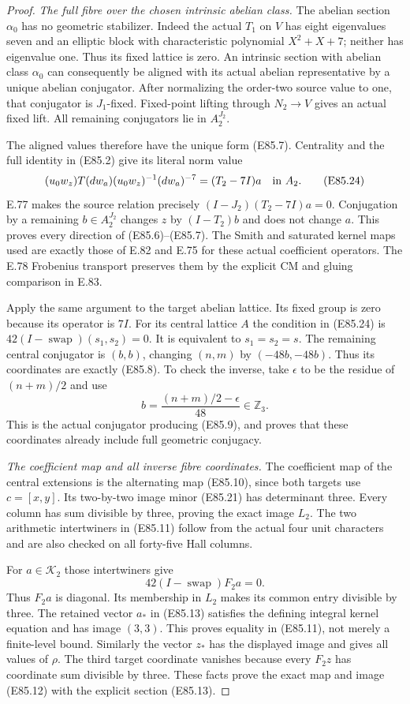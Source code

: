 \begin{proof}
\emph{The full fibre over the chosen intrinsic abelian class.}
The abelian section $\alpha_0$ has no geometric
stabilizer. Indeed the actual $T_1$ on $V$ has
eight eigenvalues seven and an elliptic block
with characteristic polynomial $X^2+X+7$;
neither has eigenvalue one. Thus its fixed
lattice is zero. An intrinsic section with
abelian class $\alpha_0$ can consequently be
aligned with its actual abelian representative
by a unique abelian conjugator. After normalizing
the order-two source value to one, that
conjugator is $J_1$-fixed. Fixed-point lifting
through $N_2\to V$ gives an actual fixed lift.
All remaining conjugators lie in $A_2^{J_2}$.

The aligned values therefore have the unique
form (E85.7). Centrality and the full identity
in (E85.2) give its literal norm value
\[
 (u_0w_z)T(dw_a)(u_0w_z)^{-1}(dw_a)^{-7}
                            =(T_2-7I)a\quad\hbox{in }A_2.
 \tag{E85.24}
\]
E.77 makes the source relation precisely
$(I-J_2)(T_2-7I)a=0$. Conjugation by a remaining
$b\in A_2^{J_2}$ changes $z$ by $(I-T_2)b$ and
does not change $a$. This proves every direction
of (E85.6)--(E85.7). The Smith and saturated
kernel maps used are exactly those of E.82 and
E.75 for these actual coefficient operators.
The E.78 Frobenius transport preserves them by
the explicit CM and gluing comparison in E.83.

Apply the same argument to the target abelian
lattice. Its fixed group is zero because its
operator is $7I$. For its central lattice $A$
the condition in (E85.24) is
$42(I-\operatorname{swap})(s_1,s_2)=0$.
It is equivalent to $s_1=s_2=s$. The remaining
central conjugator is $(b,b)$, changing
$(n,m)$ by $(-48b,-48b)$. Thus its coordinates
are exactly (E85.8). To check the inverse,
take $\epsilon$ to be the residue of
$(n+m)/2$ and use
\[
               b=\frac{(n+m)/2-\epsilon}{48}\in\mathbb Z_3.
 \tag{E85.25}
\]
This is the actual conjugator producing
(E85.9), and proves that these coordinates
already include full geometric conjugacy.

\emph{The coefficient map and all inverse fibre coordinates.}
The coefficient map of the central extensions
is the alternating map (E85.10), since both
targets use $c=[x,y]$. Its two-by-two image
minor (E85.21) has determinant three. Every
column has sum divisible by three, proving
the exact image $L_2$. The two arithmetic
intertwiners in (E85.11) follow from the actual
four unit characters and are also checked on
all forty-five Hall columns.

For $a\in\mathcal K_2$ those intertwiners give
\[
       42(I-\operatorname{swap})F_2a=0.
 \tag{E85.26}
\]
Thus $F_2a$ is diagonal. Its membership in
$L_2$ makes its common entry divisible by
three. The retained vector $a_*$ in
(E85.13) satisfies the defining integral
kernel equation and has image $(3,3)$.
This proves equality in (E85.11), not merely
a finite-level bound. Similarly the vector
$z_*$ has the displayed image and gives all
values of $\rho$. The third target coordinate
vanishes because every $F_2z$ has coordinate
sum divisible by three. These facts prove
the exact map and image (E85.12) with the
explicit section (E85.13).


\end{proof}
